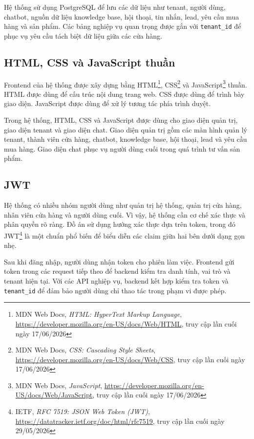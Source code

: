 \documentclass[../DoAn.tex]{subfiles}
\begin{document}
Hệ thống sử dụng PostgreSQL để lưu các dữ liệu như tenant, người dùng, chatbot, nguồn dữ liệu knowledge base, hội thoại, tin nhắn, lead, yêu cầu mua hàng và sản phẩm. Các bảng nghiệp vụ quan trọng được gắn với \texttt{tenant\_id} để phục vụ yêu cầu tách biệt dữ liệu giữa các cửa hàng.

\subsection{HTML, CSS và JavaScript thuần}
\label{subsection:3.2.5}

Frontend của hệ thống được xây dựng bằng HTML\footnote{MDN Web Docs, \textit{HTML: HyperText Markup Language}, \url{https://developer.mozilla.org/en-US/docs/Web/HTML}, truy cập lần cuối ngày 17/06/2026}, CSS\footnote{MDN Web Docs, \textit{CSS: Cascading Style Sheets}, \url{https://developer.mozilla.org/en-US/docs/Web/CSS}, truy cập lần cuối ngày 17/06/2026} và JavaScript\footnote{MDN Web Docs, \textit{JavaScript}, \url{https://developer.mozilla.org/en-US/docs/Web/JavaScript}, truy cập lần cuối ngày 17/06/2026} thuần. HTML được dùng để cấu trúc nội dung trang web. CSS được dùng để trình bày giao diện. JavaScript được dùng để xử lý tương tác phía trình duyệt.

Trong hệ thống, HTML, CSS và JavaScript được dùng cho giao diện quản trị, giao diện tenant và giao diện chat. Giao diện quản trị gồm các màn hình quản lý tenant, thành viên cửa hàng, chatbot, knowledge base, hội thoại, lead và yêu cầu mua hàng. Giao diện chat phục vụ người dùng cuối trong quá trình tư vấn sản phẩm.

\subsection{JWT}
\label{subsection:3.2.6}

Hệ thống có nhiều nhóm người dùng như quản trị hệ thống, quản trị cửa hàng, nhân viên cửa hàng và người dùng cuối. Vì vậy, hệ thống cần cơ chế xác thực và phân quyền rõ ràng. Đồ án sử dụng hướng xác thực dựa trên token, trong đó JWT\footnote{IETF, \textit{RFC 7519: JSON Web Token (JWT)}, \url{https://datatracker.ietf.org/doc/html/rfc7519}, truy cập lần cuối ngày 29/05/2026} là một chuẩn phổ biến để biểu diễn các claim giữa hai bên dưới dạng gọn nhẹ.

Sau khi đăng nhập, người dùng nhận token cho phiên làm việc. Frontend gửi token trong các request tiếp theo để backend kiểm tra danh tính, vai trò và tenant hiện tại. Với các API nghiệp vụ, backend kết hợp kiểm tra token và \texttt{tenant\_id} để đảm bảo người dùng chỉ thao tác trong phạm vi được phép.
\end{document}
